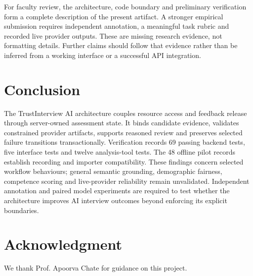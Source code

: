 \documentclass[conference]{IEEEtran}
\begin{document}
For faculty review, the architecture, code boundary and preliminary verification form a complete description of the present artifact. A stronger empirical submission requires independent annotation, a meaningful task rubric and recorded live provider outputs. These are missing research evidence, not formatting details. Further claims should follow that evidence rather than be inferred from a working interface or a successful API integration.

\section{Conclusion}
The TrustInterview AI architecture couples resource access and feedback release through server-owned assessment state. It binds candidate evidence, validates constrained provider artifacts, supports reasoned review and preserves selected failure transitions transactionally. Verification records 69 passing backend tests, five interface tests and twelve analysis-tool tests. The 48 offline pilot records establish recording and importer compatibility. These findings concern selected workflow behaviours; general semantic grounding, demographic fairness, competence scoring and live-provider reliability remain unvalidated. Independent annotation and paired model experiments are required to test whether the architecture improves AI interview outcomes beyond enforcing its explicit boundaries.

\section*{Acknowledgment}
We thank Prof. Apoorva Chate for guidance on this project.

\end{document}
